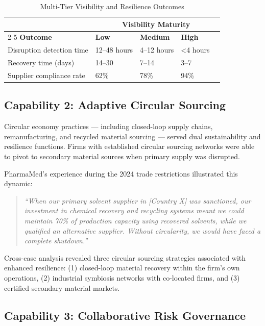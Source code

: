 \documentclass[12pt,a4paper,twoside]{article}
\begin{document}
\begin{table}[htbp]
\centering
\caption{Multi-Tier Visibility and Resilience Outcomes}
\label{tab:visibility}
\begin{tabular}{@{}p{3cm}p{2.5cm}p{2.5cm}p{2.5cm}p{2.5cm}@{}}
\toprule
& \multicolumn{4}{c}{\textbf{Visibility Maturity}} \\
\cmidrule(lr){2-5}
\textbf{Outcome} & \textbf{Low} & \textbf{Medium} & \textbf{High} \\
\midrule
Disruption detection time & 12--48 hours & 4--12 hours & <4 hours \\
Recovery time (days) & 14--30 & 7--14 & 3--7 \\
Supplier compliance rate & 62\% & 78\% & 94\% \\
\bottomrule
\end{tabular}
\end{table}

\subsection{Capability 2: Adaptive Circular Sourcing}

Circular economy practices --- including closed-loop supply chains,
remanufacturing, and recycled material sourcing --- served dual sustainability
and resilience functions.  Firms with established circular sourcing networks
were able to pivot to secondary material sources when primary supply was
disrupted.

PharmaMed's experience during the 2024 trade restrictions illustrated this
dynamic:

\begin{quote}
\itshape
``When our primary solvent supplier in [Country X] was sanctioned, our
investment in chemical recovery and recycling systems meant we could maintain
70\% of production capacity using recovered solvents, while we qualified an
alternative supplier.  Without circularity, we would have faced a complete
shutdown.''
\end{quote}

Cross-case analysis revealed three circular sourcing strategies associated with
enhanced resilience: (1) closed-loop material recovery within the firm's own
operations, (2) industrial symbiosis networks with co-located firms, and
(3) certified secondary material markets.

\subsection{Capability 3: Collaborative Risk Governance}
\end{document}

